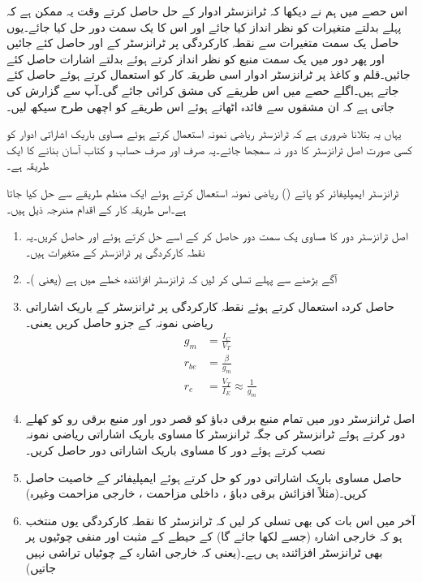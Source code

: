 اس حصے میں ہم نے دیکھا کہ ٹرانزسٹر ادوار کے حل حاصل کرتے وقت یہ ممکن ہے کہ پہلے بدلتے متغیرات کو نظر انداز کیا جائے اور اس کا یک سمت دور حل کیا جائے۔یوں حاصل یک سمت متغیرات سے نقطہ کارکردگی پر ٹرانزسٹر کے  اور  حاصل کئے جائیں اور پھر دور میں یک سمت منبع کو نظر انداز کرتے ہوئے بدلتے اشارات حاصل کئے جائیں۔قلم و کاغذ پر ٹرانزسٹر ادوار اسی طریقہ کار کو استعمال کرتے ہوئے حاصل کئے جاتے ہیں۔اگلے حصے میں اس طریقے کی مشق کرائی جائے گی۔آپ سے گزارش کی جاتی ہے کہ ان مشقوں سے فائدہ اٹھاتے ہوئے اس طریقے کو اچھی طرح سیکھ لیں۔

یہاں یہ بتلانا ضروری ہے کہ ٹرانزسٹر ریاضی نمونہ  استعمال کرتے ہوئے مساوی باریک اشاراتی ادوار کو کسی صورت اصل ٹرانزسٹر کا دور نہ سمجھا جائے۔یہ صرف اور صرف حساب و کتاب آسان بنانے کا ایک طریقہ ہے۔

ٹرانزسٹر ایمپلیفائر کو پائے () ریاضی نمونہ  استعمال کرتے ہوئے ایک منظم طریقے سے حل کیا جاتا ہے۔اس طریقہ کار کے اقدام مندرجہ ذیل ہیں۔
\begin{enumerate}
\item
اصل ٹرانزسٹر دور کا مساوی یک سمت دور حاصل کر کے اسے حل کرتے ہوئے  اور   حاصل کریں۔یہ نقطہ کارکردگی پر ٹرانزسٹر کے متغیرات ہیں۔
\item
آگے بڑھنے سے پہلے تسلی کر لیں کہ ٹرانزسٹر افزائندہ خطے میں ہے (یعنی )۔  
\item
حاصل کردہ  استعمال کرتے ہوئے نقطہ کارکردگی پر ٹرانزسٹر کے باریک 	
اشاراتی ریاضی نمونہ  کے جزو حاصل کریں یعنی۔
\begin{align*}
g_m &=\frac{I_C}{V_T}\\
r_{be}&=\frac{\beta}{g_m}\\
r_e&=\frac{V_T}{I_E} \approx \frac{1}{g_m}
\end{align*}

\item
اصل ٹرانزسٹر دور  میں تمام منبع برقی دباؤ کو قصر دور اور منبع برقی رو کو کھلے دور کرتے ہوئے ٹرانزسٹر کی جگہ ٹرانزسٹر کا مساوی باریک اشاراتی ریاضی نمونہ  	نصب کرتے ہوئے دور کا مساوی باریک اشاراتی دور حاصل کریں۔
\item
حاصل مساوی باریک اشاراتی دور کو حل کرتے ہوئے ایمپلیفائر کے خاصیت 	حاصل کریں۔(مثلاً افزائش برقی دباؤ ، داخلی مزاحمت  ، خارجی مزاحمت  وغیرہ)

\item
آخر میں اس بات کی بھی تسلی کر لیں کہ ٹرانزسٹر کا نقطہ کارکردگی یوں منتخب ہو کہ خارجی اشارہ (جسے   لکھا جائے گا) کے حیطے کے مثبت اور منفی چوٹیوں پر بھی ٹرانزسٹر افزائندہ ہی رہے۔(یعنی کہ خارجی اشارہ   کے چوٹیاں تراشی نہیں جاتیں)
\end{enumerate}
	

